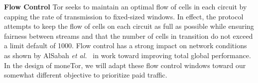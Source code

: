 \medskip
\noindent\textbf{Flow Control}
Tor seeks to maintain an optimal flow of cells in
each circuit by capping the rate of transmission to fixed-sized windows.
In effect, the protocol attempts to keep the flow of cells on each circuit as
full as possible while ensuring fairness between streams and that the number of
cells in transition do not exceed a limit default of 1000. Flow control has a
strong impact on network conditions as shown by AlSabah \textit{et
  al.}~\cite{pets2011-defenestrator} in work toward improving total global
performance. In the design of moneTor, we will adapt these flow control windows
toward our somewhat different objective to prioritize paid traffic.




%

